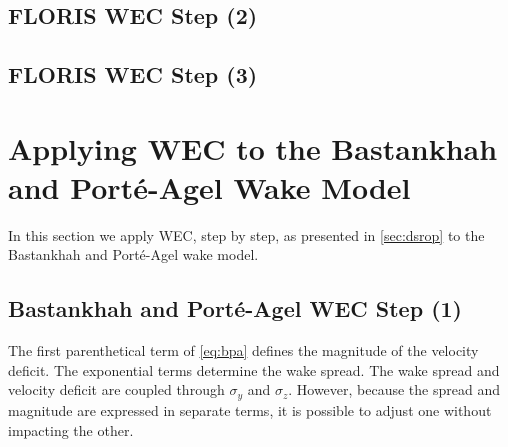 \documentclass[a4paper]{jpconf}
\begin{document}
\subsection{FLORIS WEC Step (2)}
\subsection{FLORIS WEC Step (3)}

\section{Applying WEC to the Bastankhah and Port\'e-Agel Wake Model}
In this section we apply WEC, step by step, as presented in \cref{sec:dsrop} to the Bastankhah and Port\'e-Agel wake model.  

\subsection{Bastankhah and Port\'e-Agel WEC Step (1)}
The first parenthetical term of \cref{eq:bpa} defines the magnitude of the velocity deficit. The exponential terms determine the wake spread. The wake spread and velocity deficit are coupled through $\sigma_y$ and $\sigma_z$. However, because the spread and magnitude are expressed in separate terms, it is possible to adjust one without impacting the other. 
\end{document}
